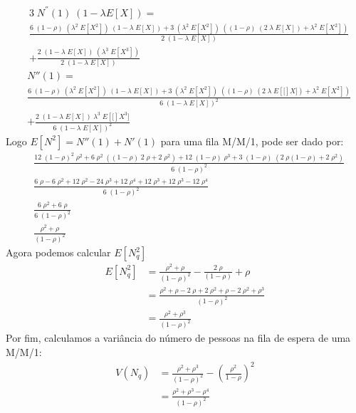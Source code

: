 \documentclass[a4paper]{article}
\newcommand{\E}[1]{E\!\left[#1\right]}
\begin{document}
\begin{align*}
    &3\;N^{''}(1)\;(1-\lambda E[X]) = \\
    &\frac{6 \; (1 - \rho) \; (\lambda^2 \; \E{X^2}) \;
        (1 - \lambda \; \E{X}) + 3 \; (\lambda^2 \; \E{X^2})
        \; ((1 - \rho) \; (2 \; \lambda \; \E{X})
        + \lambda^2 \; \E{X^2})}{2 \; (1 - \lambda \; \E{X})}\\
        &+\frac{2 \; (1 - \lambda \; \E{X})
        \;(\lambda^3 \; \E{X^3})}{2 \; (1 - \lambda \; \E{X})}
\end{align*}
\begin{align*}
    &N''(1) = \\
    &\frac{6 \; (1 - \rho) \; (\lambda^2 \; \E{X^2})
        \; (1 - \lambda \; \E{X})
        + 3 \; (\lambda^2 \; \E{X^2}) \; ((1 - \rho)
        \; (2 \; \lambda \; \E[X]) + \lambda^2 \; \E{X^2})
        }{6 \; (1 - \lambda \; \E{X})^2}\\
        &+\frac{2 \; (1 - \lambda \; \E{X}) \; \lambda^3
        \; \E[X^3]}{6 \; (1 - \lambda \; \E{X})^2}
\end{align*}
Logo \(\E{N^2} = N''(1) + N'(1)\)
para uma fila M/M/1, pode ser dado por:
\begin{align*}
    &\frac{12 \; (1 - \rho)^2 \; \rho^2
        + 6 \; \rho^2 \; ((1 - \rho) \; 2 \; \rho
        + 2 \; \rho^2) + 12 \; (1 - \rho) \; \rho^3
        + 3 \; (1 - \rho) \; (2 \; \rho (1 - \rho)
        + 2 \; \rho^2)}{6 \; (1 - \rho)^2} \\
    &\frac{6 \; \rho - 6 \; \rho^2 + 12 \; \rho^2
        - 24 \; \rho^3 + 12 \; \rho^4 + 12 \; \rho^3
        + 12 \; \rho^3 - 12 \; \rho^4}{6 \; (1 - \rho)^2} \\
    &\frac{6 \; \rho^2 + 6 \; \rho}{6 \; (1 - \rho)^2} \\
    &\frac{\rho^2 + \rho}{(1 - \rho)^2}
\end{align*}
Agora podemos calcular \(E[N_q^{2}]\)
\begin{align*}
    \E{N_q^2} &= \frac{\rho^2 + \rho}{(1 - \rho)^2}
        - \frac{2 \; \rho}{(1 - \rho)} + \rho \\
    &= \frac{\rho^2 + \rho - 2 \;\rho + 2 \; \rho^2
        + \rho - 2 \; \rho^2 + \rho^3}{(1 - \rho)^2} \\
    &= \frac{\rho^2 + \rho^3}{(1 - \rho)^2}
\end{align*}
Por fim, calculamos a variância do número de pessoas
na fila de espera de uma M/M/1:
\begin{align*}
    V(N_q) &= \frac{\rho^2 + \rho^3}{(1 - \rho)^2}
        - (\frac{\rho^2}{1 - \rho})^2 \\
    &=\frac{\rho^2 + \rho^3 - \rho^4}{(1-\rho)^2}
\end{align*}
\end{document}

